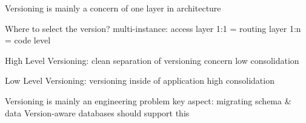 Versioning is mainly a concern of one layer in architecture

Where to select the version?
multi-instance: access layer
1:1 = routing layer
1:n = code level

High Level Versioning:
clean separation of versioning concern
low consolidation

Low Level Versioning:
versioning inside of application
high consolidation

Versioning is mainly an engineering problem
key aspect: migrating schema & data
Version-aware databases should support this

